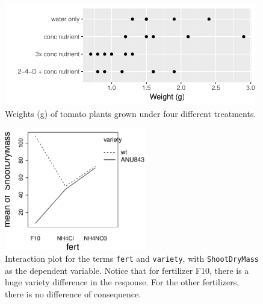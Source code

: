 \documentclass[12pt, a4paper,  BCOR=8.25mm, DIV=15]{scrartcl}\usepackage[]{graphicx}\usepackage[]{color}
\newenvironment{knitrout}{}{} %
\newcommand{\txtt}[1]{{\texttt{#1}}}
\begin{document}
\begin{figure}
\vspace*{-6pt}
\begin{knitrout}
\color{fgcolor}

{\centering \includegraphics[width=0.98\textwidth]{figure/exs-fig3_7e-1} 

}



\end{knitrout}
\caption{Weights (g) of tomato plants grown under four different
  treatments.\label{fig:Tomato}}
\end{figure}

\begin{figure}
\begin{knitrout}
\color{fgcolor}

{\centering \includegraphics[width=0.55\textwidth]{figure/exs-fig3_8e-1} 

}



\end{knitrout}
    \caption{Interaction plot for the terms \txtt{fert} and
      \txtt{variety}, with \txtt{ShootDryMass} as the dependent
      variable. Notice that for fertilizer F10, there is a huge
      variety difference in the response. For the other fertilizers,
      there is no difference of consequence.\label{fig:rice-interact}}
\end{figure}
\end{document}
